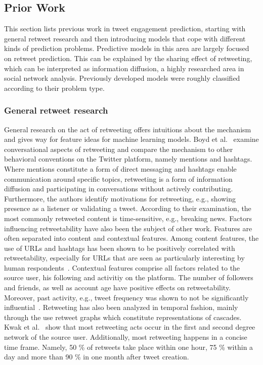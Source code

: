 \subsection{Prior Work}
\label{sec:prior_work}

This section lists previous work in tweet engagement prediction, starting with
general retweet research and then introducing models that cope with different
kinds of prediction problems.
Predictive models in this area are largely focused on retweet prediction.
This can be explained by the sharing effect of retweeting, which can be interpreted
as information diffusion, a highly researched area in social network analysis.
Previously developed models were roughly classified according to their problem type.

\subsubsection{General retweet research}

General research on the act of retweeting offers intuitions about the mechanism
and gives way for feature ideas for machine learning models.
Boyd et al.~\cite{Golder} examine conversational aspects of retweeting and
compare the mechanism to other behavioral conventions on the Twitter platform,
namely mentions and hashtags.
Where mentions constitute a form of direct messaging and hashtags enable
communication around specific topics, retweeting is a form of information
diffusion and participating in conversations without actively contributing.
Furthermore, the authors identify motivations for retweeting, e.g., showing
presence as a listener or validating a tweet.
According to their examination, the most commonly retweeted content is
time-sensitive, e.g., breaking news.
Factors influencing retweetability have also been the subject of other work.
Features are often separated into content and contextual features.
Among content features, the use of URLs and hashtags has been shown to be
positively correlated with retweetability, especially for URLs that are seen
as particularly interesting by human respondents~\cite{Suh}.
Contextual features comprise all factors related to the source user, his
following and activitiy on the platform.
The number of followers and friends, as well as account age have positive
effects on retweetability.
Moreover, past activity, e.g., tweet frequency was shown to not be significantly
influential~\cite{Bakshy2011, Suh}.
Retweeting has also been analyzed in temporal fashion, mainly through the use
retweet graphs which constitute representations of cascades.
Kwak et al.~\cite{Kwak2010} show that most retweeting acts occur in the first
and second degree network of the source user.
Additionally, most retweeting happens in a concise time frame.
Namely, 50 \% of retweets take place within one hour, 75 \% within a day and more
than 90 \% in one month after tweet creation.


